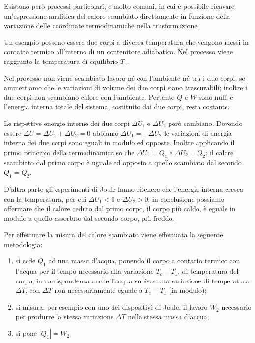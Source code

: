 \documentclass[class=book, crop=false, oneside, 12pt]{standalone}
\begin{document}
Esistono però processi particolari, e molto comuni, in cui è possibile ricavare un'espressione analitica del calore scambiato direttamente in funzione della variazione delle coordinate termodinamiche nella trasformazione.

Un esempio possono essere due corpi a diversa temperatura che vengono messi in contatto termico all'interno di un contenitore adiabatico. 
Nel processo viene raggiunto la temperatura di equilibrio \(T_e\).

Nel processo non viene scambiato lavoro né con l'ambiente né tra i due corpi, se ammettiamo che le variazioni di volume dei due corpi siano trascurabili; inoltre i due corpi non scambiano calore con l'ambiente. 
Pertanto \(Q\) e \(W\) sono nulli e l'energia interna totale del sistema, costituito dai due corpi, resta costante.

Le rispettive energie interne dei due corpi \(\Delta U_1\) e \(\Delta U_2\) però cambiano.
Dovendo essere \(\Delta U = \Delta U_1 + \Delta U_2 = 0\) abbiamo \(\Delta U_1 = - \Delta U_2\) le variazioni di energia interna dei due corpi sono eguali in modulo ed opposte.
Inoltre applicando il primo principio della termodinamica so che \(\Delta U_1 = Q_1\) e \(\Delta U_2 = Q_2\): il calore scambiato dal primo corpo è uguale ed opposto a quello scambiato dal secondo \(Q_1 = Q_2\).

D'altra parte gli esperimenti di Joule fanno ritenere che l'energia interna cresca con la temperatura, per cui \(\Delta U_1 < 0 \) e \(\Delta U_2 > 0 \):
in conclusione possiamo affermare che il calore ceduto dal primo corpo, il corpo più caldo, è eguale in modulo a quello assorbito dal secondo corpo, più freddo. 

Per effettuare la misura del calore scambiato viene effettuata la seguente metodologia:
\begin{enumerate}
    \item si cede \(Q_1\) ad una massa d'acqua, ponendo il corpo a contatto termico con l'acqua per il tempo necessario alla variazione \(T_e - T_1\), di temperatura del corpo; 
    in corrispondenza anche l'acqua subisce una variazione di temperatura \(\Delta T\), con \(\Delta T\) non necessariamente eguale a \(T_e - T_1\) (in modulo);
    \item si misura, per esempio con uno dei dispositivi di Joule, il lavoro \(W_2\) necessario per produrre la stessa variazione \(\Delta T\) nella stessa massa d'acqua; 
    \item si pone \(| Q_1 | = W_2\)
\end{enumerate}
\end{document}
